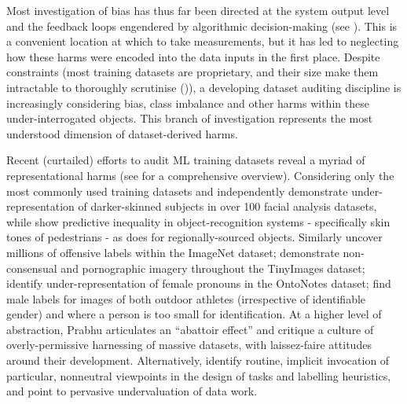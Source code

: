 Most investigation of bias has thus far been directed at the system output level and the feedback loops engendered by algorithmic decision-making (see \textcite{abid2021PersistentAntiMuslimBias, buolamwini2018GenderShadesIntersectional, gehman2020RealToxicityPromptsEvaluatingNeural, wolfe2022AmericanWhiteMultimodal}). This is a convenient location at which to take measurements, but it has led to neglecting how these harms were encoded into the data inputs in the first place. Despite constraints (most training datasets are proprietary, and their size make them intractable to thoroughly scrutinise (\cite{bender2021DangersStochasticParrots})), a developing dataset auditing discipline is increasingly considering bias, class imbalance and other harms within these under-interrogated objects. This branch of investigation represents the most understood dimension of dataset-derived harms.

Recent (curtailed) efforts to audit ML training datasets reveal a myriad of representational harms (see \textcite{koch2021ReducedReusedRecycled} for a comprehensive overview). Considering only the most commonly used training datasets \textcite{buolamwini2018GenderShadesIntersectional} and \textcite{raji2021FaceSurveyFacial} independently demonstrate under-representation of darker-skinned subjects in over 100 facial analysis datasets, while \textcite{wilson2019PredictiveInequityObject} show predictive inequality in object-recognition systems - specifically skin tones of pedestrians - as does \textcite{devries2019DoesObjectRecognitiona} for regionally-sourced objects. Similarly \textcite{crawford2021ExcavatingAIPolitics} uncover millions of offensive labels within the ImageNet dataset; \textcite{prabhu2020LargeImageDatasets} demonstrate non-consensual and pornographic imagery throughout the TinyImages dataset; \textcite{zhao2018GenderBiasCoreference} identify under-representation of female pronouns in the OntoNotes dataset; \textcite{kreutzer2022QualityGlanceAudit} find male labels for images of both outdoor athletes (irrespective of identifiable gender) and where a person is too small for identification. At a higher level of abstraction, Prabhu articulates an “abattoir effect” and \textcite{jo2020LessonsArchivesStrategies} critique a culture of overly-permissive harnessing of massive datasets, with laissez-faire attitudes around their development. Alternatively, \textcite{paullada2021DataItsDis} identify routine, implicit invocation of particular, nonneutral viewpoints in the design of tasks and labelling heuristics, and point to pervasive undervaluation of data work.  

